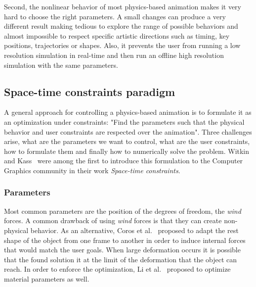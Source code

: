 Second, the nonlinear behavior of most physics-based animation makes it very hard to choose the right parameters. A small changes can produce a very different result making tedious to explore the range of possible behaviors and almost impossible to respect specific artistic directions such as timing, key positions, trajectories or shapes. Also, it prevents the user from running a low resolution simulation in real-time and then run an offline high resolution simulation with the same parameters.

\subsection{Space-time constraints paradigm}
A general approach for controlling a physics-based animation is to formulate it as an optimization under constraints: "Find the parameters such that the physical behavior and user constraints are respected over the animation". Three challenges arise, what are the parameters we want to control, what are the user constraints, how to formulate them and finally how to numerically solve the problem. Witkin and Kass~\cite{Witkin1988} were among the first to introduce this formulation to the Computer Graphics community in their work \emph{Space-time constraints}.

\subsubsection{Parameters}
Most common parameters are the position of the degrees of freedom, the \emph{wind} forces. A common drawback of using \emph{wind} forces is that they can create non-physical behavior. As an alternative, Coros et al.~\cite{Coros2012} proposed to adapt the rest shape of the object from one frame to another in order to induce internal forces that would match the user goals. When large deformation occurs it is possible that the found solution it at the limit of the deformation that the object can reach. In order to enforce the optimization, Li et al.~\cite{Li2014} proposed to optimize material parameters as well. 

